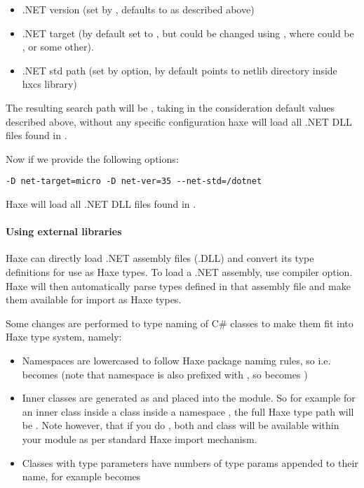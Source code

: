 \begin{itemize}
	\item .NET version (set by , defaults to  as described above)
	\item .NET target (by default set to , but could be changed using , where  could be ,  or some other).
	\item .NET std path (set by  option, by default points to netlib directory inside hxcs library)
\end{itemize}

The resulting search path will be , taking in the consideration default values described above, without any specific configuration haxe will load all .NET DLL files found in .

Now if we provide the following options:

\begin{lstlisting}
-D net-target=micro -D net-ver=35 --net-std=/dotnet
\end{lstlisting}

Haxe will load all .NET DLL files found in .


\paragraph{Using external libraries}

Haxe can directly load .NET assembly files (.DLL) and convert its type definitions for use as Haxe types. To load a .NET assembly, use  compiler option. Haxe will then automatically parse types defined in that assembly file and make them available for import as Haxe types.

Some changes are performed to type naming of C\# classes to make them fit into Haxe type system, namely:

\begin{itemize}
	\item Namespaces are lowercased to follow Haxe package naming rules, so i.e.  becomes  (note that  namespace is also prefixed with , so   becomes  )
	\item Inner classes are generated as  and placed into the  module. So for example for an inner class  inside a class  inside a namespace , the full Haxe type path will be . Note however, that if you do , both  and  class will be available within your module as per standard Haxe import mechanism.
	\item Classes with type parameters have numbers of type params appended to their name, for example  becomes 
\end{itemize}



